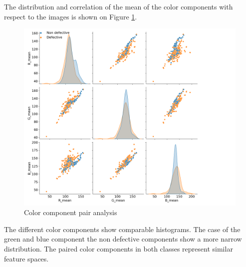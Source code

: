 \documentclass[10pt, final]{article}
\begin{document}
			The distribution and correlation of the mean of the color components with respect to the images is shown on 
			Figure \ref{fig:comp_pair}.
			\begin{figure}[!ht]
				\centering
				\includegraphics[width=\textwidth]{./plots/comp_pair.png}
				\caption{Color component pair analysis}
				\label{fig:comp_pair}
			\end{figure}
			The different color components show comparable histograms.
			The case of the green and blue component the non defective components show a more narrow distribution.
			The paired color components in both classes represent similar feature spaces.
\end{document}
